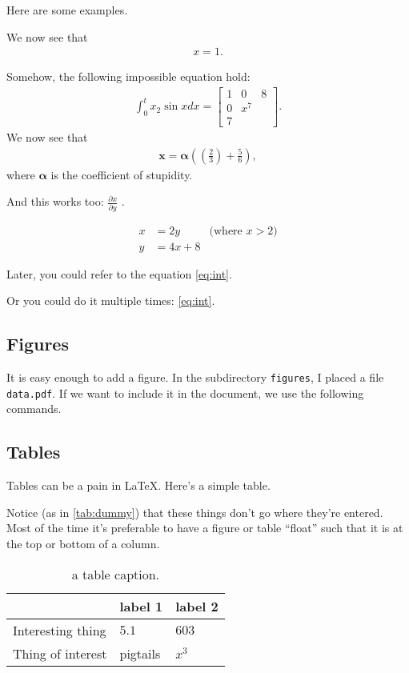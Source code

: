 \documentclass[10pt,twocolumn]{article}
\begin{document}
Here are some examples.

We now see that
\begin{align}
	x = 1 .
\end{align}

Somehow, the following impossible equation hold:
\begin{align} \label{eq:int}
	\int_0^t x_2 \sin{x} dx = 
	\begin{bmatrix}
		1 & 0 & 8 \\
		0 & x^7 \\
		7 &
	\end{bmatrix} .
\end{align}
We now see that 
\begin{align}
	\bm{x} = \bm{\alpha} 
    \left( 
    	\left(
        	\frac{2}{3}
        \right) + 
        \frac{5}{6} 
    \right) , 
\end{align}
where $\bm{\alpha}$ is the coefficient of stupidity.

And this works too: $\frac{\partial x}{\partial y}$ .

\begin{subequations}
\begin{align*}
	x &= 2 y & \text{(where $x>2$)} \\
	y &= 4 x + 8 &
\end{align*}
\end{subequations}

Later, you could refer to the equation \autoref{eq:int}.

Or you could do it multiple times: \autoref{eq:int}.

\subsection{Figures}
It is easy enough to add a figure. In the subdirectory \texttt{figures}, I placed a file \texttt{data.pdf}. If we want to include it in the document, we use the following commands.



\subsection{Tables}
Tables can be a pain in \LaTeX{}. Here's a simple table.

Notice (as in \autoref{tab:dummy}) that these things don't go where they're entered. Most of the time it's preferable to have a figure or table ``float'' such that it is at the top or bottom of a column.
 
\begin{table}[bt]
	\begin{tabularx}{1\linewidth}{ lXX }
		\hline
		 & \textbf{label 1} & \textbf{label 2} \\
		\hline
		Interesting thing & $5.1$ & $603$ \\
		Thing of interest & pigtails & $x^3$ \\
		\hline
	\end{tabularx}
	\caption{a table caption.}
	\label{tab:dummy}
\end{table}
\end{document}
